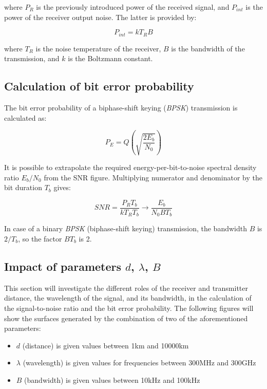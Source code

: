 where $P_R$ is the previously introduced power of the received signal, and $P_{int}$ is the power of the receiver output noise.
The latter is provided by:

\begin{equation}
	P_{int} = k T_R B
\end{equation}

where $T_R$ is the noise temperature of the receiver, $B$ is the bandwidth of the transmission, and $k$ is the Boltzmann constant.


\subsection{Calculation of bit error probability}
The bit error probability of a biphase-shift
keying (\emph{BPSK}) transmission is calculated as:

\begin{equation}
	P_E = Q\left(\sqrt{\frac{2E_b}{N_0}}\right)
\end{equation}

It is possible to extrapolate the required energy-per-bit-to-noise spectral density ratio $E_b/N_0$ from the SNR figure.
Multiplying numerator and denominator by the bit duration $T_b$ gives:

\begin{equation}
	SNR = \frac{P_R T_b}{k T_R T_b} \rightarrow \frac{E_b}{N_0 B T_b}
\end{equation}

In case of a binary \emph{BPSK} (biphase-shift
keying) transmission, the bandwidth $B$ is $2/T_b$, so the factor $B T_b$ is 2.


\subsection{Impact of parameters $d$, $\lambda$, $B$}
This section will investigate the different roles of the receiver and transmitter distance, the wavelength of the signal, and its bandwidth, in the calculation of the signal-to-noise ratio and the bit error probability.
The following figures will show the surfaces generated by the combination of two of the aforementioned parameters:

\begin{itemize}
	\item $d$ (distance) is given values between 1km and 10000km
	\item $\lambda$ (wavelength) is given values for frequencies between 300MHz and 300GHz
	\item $B$ (bandwidth) is given values between 10kHz and 100kHz
\end{itemize}

